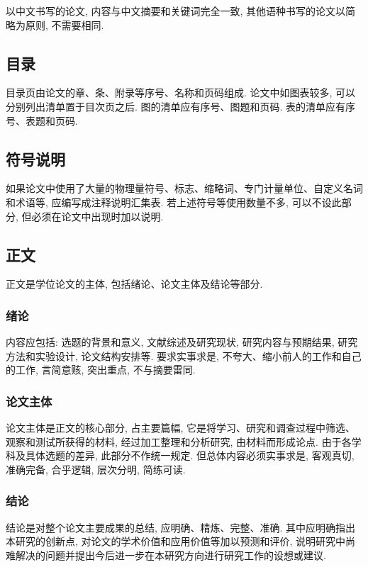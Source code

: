 以中文书写的论文, 内容与中文摘要和关键词完全一致, 其他语种书写的论文以简略为原则, 不需要相同.

\subsection{目录}

目录页由论文的章、条、附录等序号、名称和页码组成. 论文中如图表较多, 可以分别列出清单置于目次页之后. 图的清单应有序号、图题和页码. 表的清单应有序号、表题和页码.

\subsection{符号说明}

如果论文中使用了大量的物理量符号、标志、缩略词、专门计量单位、自定义名词和术语等, 应编写成注释说明汇集表. 若上述符号等使用数量不多, 可以不设此部分, 但必须在论文中出现时加以说明.

\subsection{正文}

正文是学位论文的主体, 包括绪论、论文主体及结论等部分.

\subsubsection{绪论}

内容应包括: 选题的背景和意义, 文献综述及研究现状, 研究内容与预期结果, 研究方法和实验设计, 论文结构安排等. 要求实事求是, 不夸大、缩小前人的工作和自己的工作, 言简意赅, 突出重点, 不与摘要雷同.

\subsubsection{论文主体}

论文主体是正文的核心部分, 占主要篇幅, 它是将学习、研究和调查过程中筛选、观察和测试所获得的材料, 经过加工整理和分析研究, 由材料而形成论点. 由于各学科及具体选题的差异, 此部分不作统一规定. 但总体内容必须实事求是, 客观真切, 准确完备, 合乎逻辑, 层次分明, 简练可读.

\subsubsection{结论}

结论是对整个论文主要成果的总结, 应明确、精炼、完整、准确. 其中应明确指出本研究的创新点, 对论文的学术价值和应用价值等加以预测和评价, 说明研究中尚难解决的问题并提出今后进一步在本研究方向进行研究工作的设想或建议.

